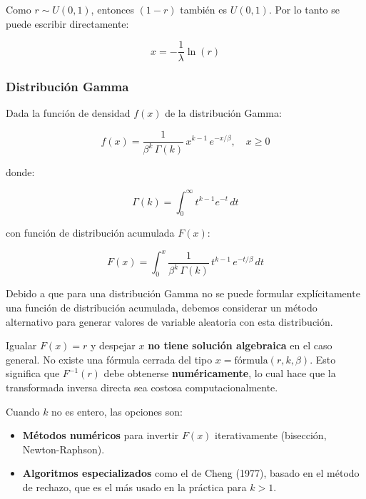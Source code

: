 \documentclass{article}
\begin{document}
Como $r \sim U(0, 1)$, entonces $(1 - r)$ también es $U(0, 1)$. Por lo tanto se puede escribir
directamente:

\begin{equation}
    x = -\frac{1}{\lambda}\ln(r)
\end{equation}


\subsubsection{Distribución Gamma}

Dada la función de densidad $f(x)$ de la distribución Gamma:

\begin{equation}
    f(x) = \frac{1}{\beta^k\,\Gamma(k)}\, x^{k-1}\, e^{-x/\beta}, \quad x \geq 0
\end{equation}

donde:

\begin{equation}
    \Gamma(k) = \int_0^{\infty} t^{k-1} e^{-t}\, dt
\end{equation}

con función de distribución acumulada $F(x)$:

\begin{equation}
    F(x) = \int_0^x \frac{1}{\beta^k\,\Gamma(k)}\, t^{k-1}\, e^{-t/\beta}\, dt
\end{equation}

Debido a que para una distribución Gamma no se puede formular explícitamente una
función de distribución acumulada, debemos considerar un método alternativo para generar
valores de variable aleatoria con esta distribución.

Igualar $F(x) = r$ y despejar $x$ \textbf{no tiene solución algebraica} en el caso general.
No existe una fórmula cerrada del tipo $x = \text{fórmula}(r, k, \beta)$. Esto significa que
$F^{-1}(r)$ debe obtenerse \textbf{numéricamente}, lo cual hace que la transformada inversa
directa sea costosa computacionalmente.

Cuando $k$ no es entero, las opciones son:

\begin{itemize}
    \item \textbf{Métodos numéricos} para invertir $F(x)$ iterativamente (bisección, Newton-Raphson).
    \item \textbf{Algoritmos especializados} como el de Cheng (1977), basado en el método de
    rechazo, que es el más usado en la práctica para $k > 1$.
\end{itemize}
\end{document}
